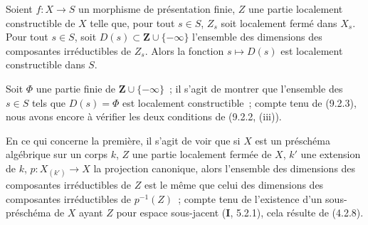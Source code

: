 
\begin{proposition}[9.5.5]
\label{IV.9.5.5-fr}
Soient $f:X\to S$ un morphisme de présentation finie, $Z$ une partie
localement constructible de $X$ telle que, pour tout $s\in S$, $Z_s$ soit
localement fermé dans $X_s$. Pour tout $s\in S$, soit
$D(s)\subset\mathbf Z\cup\{-\infty\}$ l'ensemble des dimensions des
composantes irréductibles de $Z_s$. Alors la fonction $s\mapsto D(s)$ est
localement constructible dans $S$.
\end{proposition}

Soit $\Phi$ une partie finie de $\mathbf Z\cup\{-\infty\}$~; il s'agit de
montrer que l'ensemble des $s\in S$ tels que $D(s)=\Phi$ est localement
constructible~; compte tenu de (9.2.3), nous avons encore à vérifier les deux
conditions de (9.2.2, (iii)).

En ce qui concerne la première, il s'agit de voir que si $X$ est un préschéma
algébrique sur un corps $k$, $Z$ une partie localement fermée de $X$, $k'$ une
extension de $k$, $p:X_{(k')}\to X$ la projection canonique, alors l'ensemble
des dimensions des composantes irréductibles de $Z$ est le même que celui des
dimensions des composantes irréductibles de $p^{-1}(Z)$~; compte tenu de
l'existence d'un sous-préschéma de $X$ ayant $Z$ pour espace sous-jacent
(\textbf{I}, 5.2.1), cela résulte de (4.2.8).

